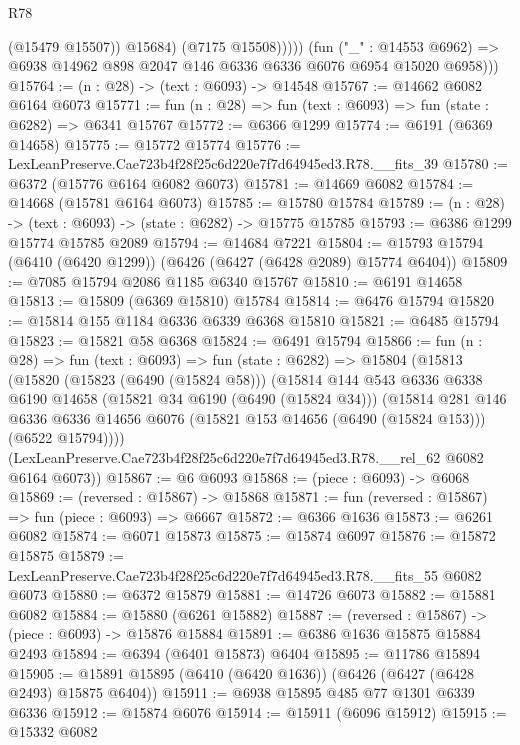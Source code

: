 \begin{lexlean}{R78}
\begin{coremodule}
                    (@15479 @15507))
                  @15684)
                (@7175 @15508)))))
        (fun ("_" : @14553 @6962) =>
        @6938 @14962 @898 @2047 @146 @6336 @6336 @6076 @6954 @15020 @6958)))
@15764 := (n : @28) -> (text : @6093) -> @14548
@15767 := @14662 @6082 @6164 @6073
@15771 := fun (n : @28) => fun (text : @6093) => fun (state : @6282) => @6341 @15767
@15772 := @6366 @1299
@15774 := @6191 (@6369 @14658)
@15775 := @15772 @15774
@15776 := LexLeanPreserve.Cae723b4f28f25c6d220e7f7d64945ed3.R78.__fits_39
@15780 := @6372 (@15776 @6164 @6082 @6073)
@15781 := @14669 @6082
@15784 := @14668 (@15781 @6164 @6073)
@15785 := @15780 @15784
@15789 := (n : @28) -> (text : @6093) -> (state : @6282) -> @15775 @15785
@15793 := @6386 @1299 @15774 @15785 @2089
@15794 := @14684 @7221
@15804 := @15793 @15794 (@6410 (@6420 @1299)) (@6426 (@6427 (@6428 @2089) @15774 @6404))
@15809 := @7085 @15794 @2086 @1185 @6340 @15767
@15810 := @6191 @14658
@15813 := @15809 (@6369 @15810) @15784
@15814 := @6476 @15794
@15820 := @15814 @155 @1184 @6336 @6339 @6368 @15810
@15821 := @6485 @15794
@15823 := @15821 @58 @6368
@15824 := @6491 @15794
@15866 := fun (n : @28) =>
  fun (text : @6093) =>
  fun (state : @6282) =>
  @15804
    (@15813
      (@15820
        (@15823 (@6490 (@15824 @58)))
        (@15814
          @144
          @543
          @6336
          @6338
          @6190
          @14658
          (@15821 @34 @6190 (@6490 (@15824 @34)))
          (@15814
            @281
            @146
            @6336
            @6336
            @14656
            @6076
            (@15821 @153 @14656 (@6490 (@15824 @153)))
            (@6522 @15794))))
      (LexLeanPreserve.Cae723b4f28f25c6d220e7f7d64945ed3.R78.__rel_62 @6082 @6164 @6073))
@15867 := @6 @6093
@15868 := (piece : @6093) -> @6068
@15869 := (reversed : @15867) -> @15868
@15871 := fun (reversed : @15867) => fun (piece : @6093) => @6667
@15872 := @6366 @1636
@15873 := @6261 @6082
@15874 := @6071 @15873
@15875 := @15874 @6097
@15876 := @15872 @15875
@15879 := LexLeanPreserve.Cae723b4f28f25c6d220e7f7d64945ed3.R78.__fits_55 @6082 @6073
@15880 := @6372 @15879
@15881 := @14726 @6073
@15882 := @15881 @6082
@15884 := @15880 (@6261 @15882)
@15887 := (reversed : @15867) -> (piece : @6093) -> @15876 @15884
@15891 := @6386 @1636 @15875 @15884 @2493
@15894 := @6394 (@6401 @15873) @6404
@15895 := @11786 @15894
@15905 := @15891 @15895 (@6410 (@6420 @1636)) (@6426 (@6427 (@6428 @2493) @15875 @6404))
@15911 := @6938 @15895 @485 @77 @1301 @6339 @6336
@15912 := @15874 @6076
@15914 := @15911 (@6096 @15912)
@15915 := @15332 @6082

\end{coremodule}
\end{lexlean}
